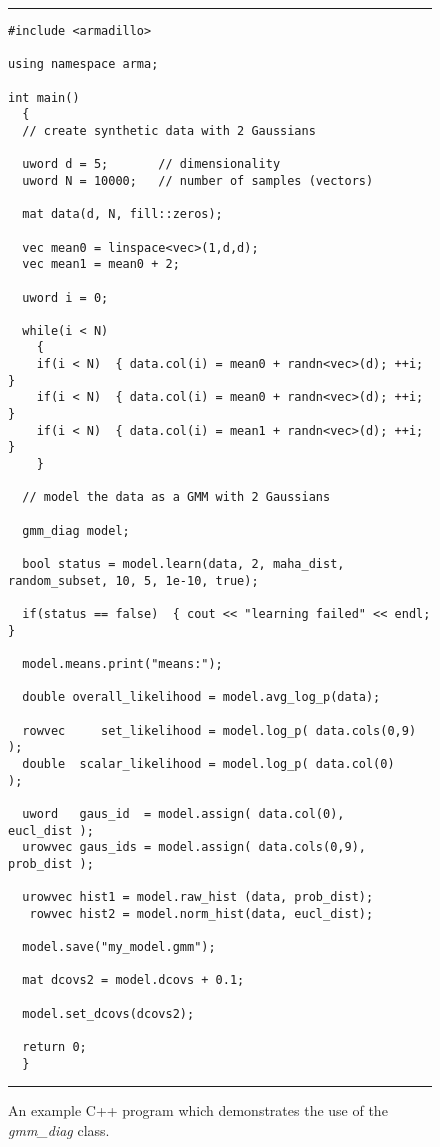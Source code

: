 \begin{figure}
\hrule
\vspace{0.5ex}
\begin{Verbatim}[fontsize=\footnotesize,fontseries=b]
#include <armadillo>

using namespace arma;

int main()
  {
  // create synthetic data with 2 Gaussians
  
  uword d = 5;       // dimensionality
  uword N = 10000;   // number of samples (vectors)
  
  mat data(d, N, fill::zeros);
  
  vec mean0 = linspace<vec>(1,d,d);
  vec mean1 = mean0 + 2;
  
  uword i = 0;
  
  while(i < N)
    {
    if(i < N)  { data.col(i) = mean0 + randn<vec>(d); ++i; }
    if(i < N)  { data.col(i) = mean0 + randn<vec>(d); ++i; }
    if(i < N)  { data.col(i) = mean1 + randn<vec>(d); ++i; }
    }
  
  // model the data as a GMM with 2 Gaussians
  
  gmm_diag model;
  
  bool status = model.learn(data, 2, maha_dist, random_subset, 10, 5, 1e-10, true);
  
  if(status == false)  { cout << "learning failed" << endl; }
  
  model.means.print("means:");
  
  double overall_likelihood = model.avg_log_p(data);
  
  rowvec     set_likelihood = model.log_p( data.cols(0,9) );
  double  scalar_likelihood = model.log_p( data.col(0)    );
  
  uword   gaus_id  = model.assign( data.col(0),    eucl_dist );
  urowvec gaus_ids = model.assign( data.cols(0,9), prob_dist );
  
  urowvec hist1 = model.raw_hist (data, prob_dist);
   rowvec hist2 = model.norm_hist(data, eucl_dist);
  
  model.save("my_model.gmm");
  
  mat dcovs2 = model.dcovs + 0.1;
  
  model.set_dcovs(dcovs2);
  
  return 0;
  }
\end{Verbatim}
\vspace{-1ex}
\hrule
\vspace{0.5ex}
\caption
  {
  An example C++ program which demonstrates the use of the {\it gmm\_diag} class.
  }
\label{fig:example_usage}
\end{figure}
